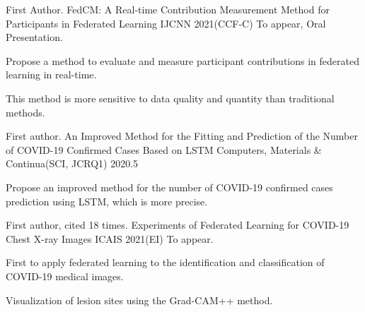 

\begin{cventries}
	\cventry
	{First Author.} %
	{FedCM: A Real-time Contribution Measurement Method for Participants in Federated Learning} %
	{IJCNN 2021(CCF-C)} %
	{To appear, Oral Presentation.} %
	{
		\begin{cvitems} %
			\item {Propose a method to evaluate and measure participant contributions in federated learning in real-time.}
			\item {This method is more sensitive to data quality and quantity than traditional methods.}
		\end{cvitems}
	}

  \cventry
    {First author.} %
    {An Improved Method for the Fitting and Prediction of the Number of COVID-19 Confirmed Cases Based on LSTM} %
    {Computers, Materials \& Continua(SCI, JCRQ1)} %
    {2020.5} %
    {
      \begin{cvitems} %
      	\item {Propose an improved method for the number of COVID-19 confirmed cases prediction using LSTM, which is more precise.}
      \end{cvitems}
    }

	\cventry
	{First author, cited 18 times.} %
	{Experiments of Federated Learning for COVID-19 Chest X-ray Images} %
	{ICAIS 2021(EI)} %
	{To appear.} %
	{
		\begin{cvitems} %
			\item {First to apply federated learning to the identification and classification of COVID-19 medical images.}
			\item {Visualization of lesion sites using the Grad-CAM++ method.}
		\end{cvitems}
	}

\end{cventries}
